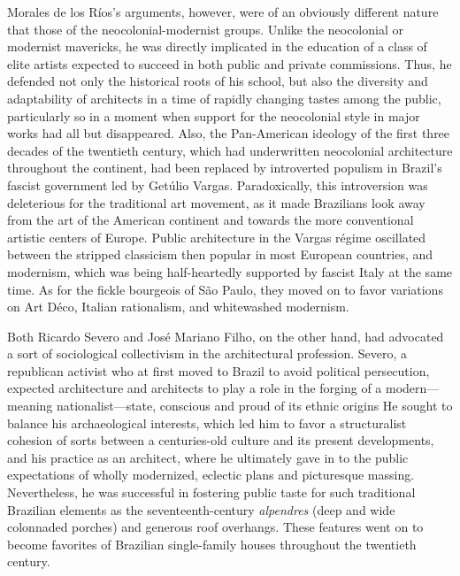 Morales de los Ríos's arguments, however, were of an obviously different
nature that those of the neocolonial-modernist groups. Unlike the
neocolonial or modernist mavericks, he was directly implicated in the
education of a class of elite artists expected to succeed in both public
and private commissions. Thus, he defended not only the historical roots
of his school, but also the diversity and adaptability of architects in
a time of rapidly changing tastes among the public, particularly so in a
moment when support for the neocolonial style in major works had all but
disappeared. Also, the Pan-American ideology of the first three decades
of the twentieth century, which had underwritten neocolonial
architecture throughout the continent, had been replaced by introverted
populism in Brazil's fascist government led by Getúlio Vargas.
Paradoxically, this introversion was deleterious for the traditional art
movement, as it made Brazilians look away from the art of the American
continent and towards the more conventional artistic centers of Europe.
Public architecture in the Vargas régime oscillated between the stripped
classicism then popular in most European countries, and modernism, which
was being half-heartedly supported by fascist Italy at the same time. As
for the fickle bourgeois of São Paulo, they moved on to favor variations
on Art Déco, Italian rationalism, and whitewashed modernism.

Both Ricardo Severo and José Mariano Filho, on the other hand, had
advocated a sort of sociological collectivism in the architectural
profession. Severo, a republican activist who at first moved to Brazil
to avoid political persecution, expected architecture and architects to
play a role in the forging of a modern---meaning nationalist---state,
conscious and proud of its ethnic origins
\autocite[p.~29]{mello:2007ricardo} He sought to balance his
archaeological interests, which led him to favor a structuralist
cohesion of sorts between a centuries-old culture and its present
developments, and his practice as an architect, where he ultimately gave
in to the public expectations of wholly modernized, eclectic plans and
picturesque massing. Nevertheless, he was successful in fostering public
taste for such traditional Brazilian elements as the seventeenth-century
\emph{alpendres} (deep and wide colonnaded porches) and generous roof
overhangs. These features went on to become favorites of Brazilian
single-family houses throughout the twentieth century.

